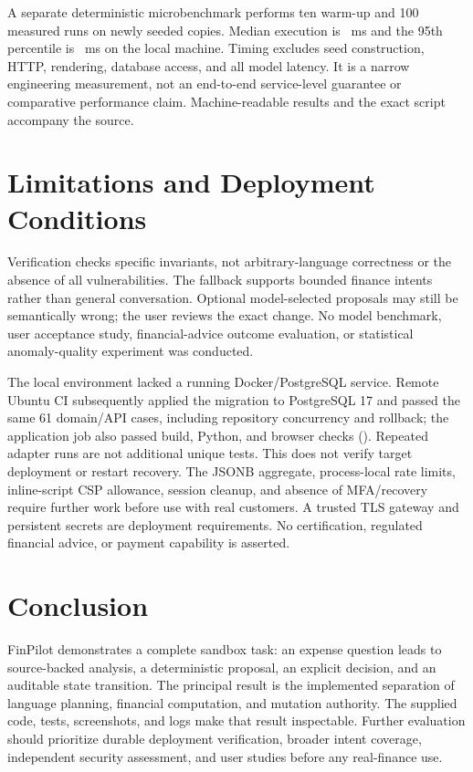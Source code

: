 \documentclass[conference,a4paper]{IEEEtran}
\begin{document}
A separate deterministic microbenchmark performs ten warm-up and 100 measured runs on newly seeded copies. Median execution is \AgentMedian{}~ms and the 95th percentile is \AgentPninetyfive{}~ms on the local machine. Timing excludes seed construction, HTTP, rendering, database access, and all model latency. It is a narrow engineering measurement, not an end-to-end service-level guarantee or comparative performance claim. Machine-readable results and the exact script accompany the source.

\section{Limitations and Deployment Conditions}
Verification checks specific invariants, not arbitrary-language correctness or the absence of all vulnerabilities. The fallback supports bounded finance intents rather than general conversation. Optional model-selected proposals may still be semantically wrong; the user reviews the exact change. No model benchmark, user acceptance study, financial-advice outcome evaluation, or statistical anomaly-quality experiment was conducted.

The local environment lacked a running Docker/PostgreSQL service. Remote Ubuntu CI subsequently applied the migration to PostgreSQL 17 and passed the same 61 domain/API cases, including repository concurrency and rollback; the application job also passed build, Python, and browser checks (\VerifiedCI). Repeated adapter runs are not additional unique tests. This does not verify target deployment or restart recovery. The JSONB aggregate, process-local rate limits, inline-script CSP allowance, session cleanup, and absence of MFA/recovery require further work before use with real customers. A trusted TLS gateway and persistent secrets are deployment requirements. No certification, regulated financial advice, or payment capability is asserted.

\section{Conclusion}
FinPilot demonstrates a complete sandbox task: an expense question leads to source-backed analysis, a deterministic proposal, an explicit decision, and an auditable state transition. The principal result is the implemented separation of language planning, financial computation, and mutation authority. The supplied code, tests, screenshots, and logs make that result inspectable. Further evaluation should prioritize durable deployment verification, broader intent coverage, independent security assessment, and user studies before any real-finance use.
\end{document}
